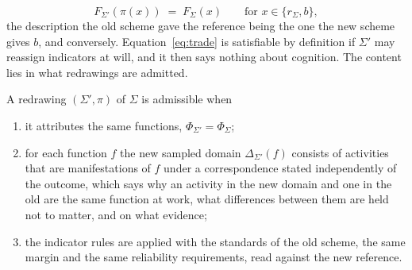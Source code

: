 \begin{equation}
\label{eq:trade}
F_{\Sigma'}(\pi(x)) \;=\; F_\Sigma(x) \qquad \text{for } x \in \{r_\Sigma, b\},
\end{equation}
the description the old scheme gave the reference being the one the new scheme gives $b$, and conversely. Equation~\eqref{eq:trade} is satisfiable by definition if $\Sigma'$ may reassign indicators at will, and it then says nothing about cognition. The content lies in what redrawings are admitted.

\begin{definition}
\label{def:admissible}
A redrawing $(\Sigma', \pi)$ of $\Sigma$ is admissible when
\begin{enumerate}[label=(A\arabic*), leftmargin=*, nosep]
\item it attributes the same functions, $\Phi_{\Sigma'} = \Phi_\Sigma$;
\item for each function $f$ the new sampled domain $\Delta_{\Sigma'}(f)$ consists of activities that are manifestations of $f$ under a correspondence stated independently of the outcome, which says why an activity in the new domain and one in the old are the same function at work, what differences between them are held not to matter, and on what evidence;
\item the indicator rules are applied with the standards of the old scheme, the same margin and the same reliability requirements, read against the new reference.
\end{enumerate}
\end{definition}


